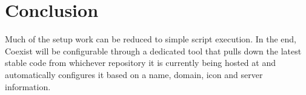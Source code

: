 
\section{Conclusion} \label{sec:conclusion}

Much of the setup work can be reduced to simple script execution. In the end,
Coexist will be configurable through a dedicated tool that pulls down the latest
stable code from whichever repository it is currently being hosted at and
automatically configures it based on a name, domain, icon and server
information.




